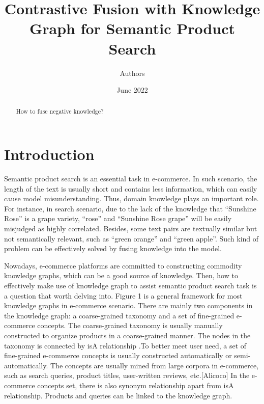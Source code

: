 \documentclass{article}
\title{Contrastive Fusion with Knowledge Graph for Semantic Product Search}
\author{Authors}
\date{June 2022}
\begin{document}
\maketitle

\begin{abstract}
How to fuse negative knowledge?
\end{abstract}

\section{Introduction}

Semantic product search is an essential task in e-commerce. In such scenario, the length of the text is usually short and contains less information, which can easily cause model misunderstanding. Thus, domain knowledge plays an important role. For instance, in search scenario, due to the lack of the knowledge that ``Sunshine Rose'' is a grape variety, ``rose'' and ``Sunshine Rose grape'' will be easily misjudged as highly correlated. Besides, some text pairs are textually similar but not semantically relevant, such as ``green orange'' and ``green apple''. Such kind of problem can be effectively solved by fusing knowledge into the model. 

Nowadays, e-commerce platforms are committed to constructing commodity knowledge graphs, which can be a good source of knowledge. Then, how to effectively make use of knowledge graph to assist semantic product search task is a question that worth delving into. Figure 1 is a general framework for most knowledge graphs in e-commerce scenario. There are mainly two components in the knowledge graph: a coarse-grained taxonomy and a set of fine-grained e-commerce concepts. The coarse-grained taxonomy is usually manually constructed to organize products in a coarse-grained manner. The nodes in the taxonomy is connected by isA relationship .To better meet user need, a set of fine-grained e-commerce concepts is usually constructed automatically or semi-automatically. The concepts are usually mined from large corpora in e-commerce, such as search queries, product titles, user-written reviews, etc.[Alicoco] In the e-commerce concepts set, there is also synonym relationship apart from isA relationship. Products and queries can be linked to the knowledge graph. 
\end{document}
